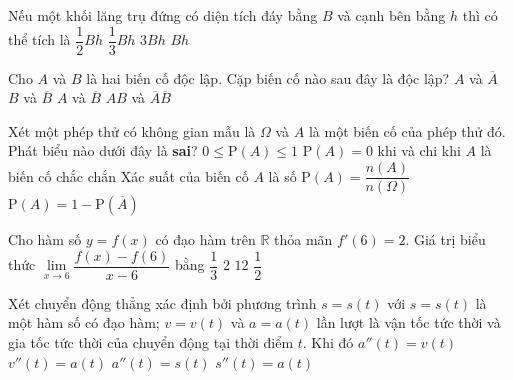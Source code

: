 \begin{ex}%
Nếu một khối lăng trụ đứng có diện tích đáy bằng $B$ và cạnh bên bằng $h$ thì có thể tích là
\choice
{$\dfrac{1}{2} B h$}
{$\dfrac{1}{3} B h$}
{$3 B h$}
{\True $Bh$}
\end{ex}

\begin{ex}%
Cho $A$ và $B$ là hai biến cố độc lập. Cặp biến cố nào sau đây là độc lập?
\choice
{$A$ và $\overline{A}$}
{$B$ và $\overline{B}$}
{\True $A$ và $\overline{B}$}
{$AB$ và $\overline{A} \overline{B}$}
\end{ex}

\begin{ex}%
Xét một phép thử có không gian mẫu là $\Omega$ và $A$ là một biến cố của phép thử đó. Phát biểu nào dưới đây là \textbf{sai}?
\choice
{$0 \leq \mathrm{P}(A) \leq 1$}
{\True $\mathrm{P}(A)=0$ khi và chi khi $A$ là biến cố chắc chắn}
{Xác suất của biến cố $A$ là số $\mathrm{P}(A)=\dfrac{n(A)}{n(\Omega)}$}
{$\mathrm{P}(A)=1-\mathrm{P}(\overline{A})$}
\end{ex}

\begin{ex}%
Cho hàm số $y=f(x)$ có đạo hàm trên $\mathbb{R}$ thỏa mãn $f'(6)=2$. Giá trị biểu thức $\lim\limits_{x\rightarrow 6}\dfrac{f(x)-f(6)}{x-6}$ bằng
\choice
{$\dfrac{1}{3}$}
{\True$2$}
{$12$}
{$\dfrac{1}{2}$}
\end{ex}

\begin{ex}%
	Xét chuyển động thẳng xác định bởi phương trình $s=s(t)$ với $s=s(t)$ là một hàm số có đạo hàm; $v=v(t)$ và $a=a(t)$ lần lượt là vận tốc tức thời và gia tốc tức thời của chuyển động tại thời điểm $t$. Khi đó
	\choice
	{$a''(t)=v(t)$}
	{$v''(t)=a(t)$}
	{$a''(t)=s(t)$}
	{\True $s''(t)=a(t)$}
	\end{ex}

